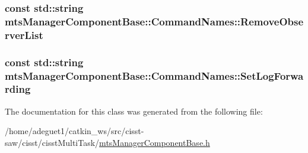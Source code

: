 \hypertarget{classmts_manager_component_base_1_1_command_names_aea2b69069bf76d20bb93e0876f9f90da}{
\subsubsection[{Remove\-Observer\-List}]{\setlength{\rightskip}{0pt plus 5cm}const std\-::string mts\-Manager\-Component\-Base\-::\-Command\-Names\-::\-Remove\-Observer\-List\hspace{0.3cm}{\ttfamily [static]}}}\label{classmts_manager_component_base_1_1_command_names_aea2b69069bf76d20bb93e0876f9f90da}
\hypertarget{classmts_manager_component_base_1_1_command_names_a494481ad11ce948eb96b3528361a9606}{
\subsubsection[{Set\-Log\-Forwarding}]{\setlength{\rightskip}{0pt plus 5cm}const std\-::string mts\-Manager\-Component\-Base\-::\-Command\-Names\-::\-Set\-Log\-Forwarding\hspace{0.3cm}{\ttfamily [static]}}}\label{classmts_manager_component_base_1_1_command_names_a494481ad11ce948eb96b3528361a9606}


The documentation for this class was generated from the following file\-:\begin{DoxyCompactItemize}
\item 
/home/adeguet1/catkin\-\_\-ws/src/cisst-\/saw/cisst/cisst\-Multi\-Task/\hyperlink{mts_manager_component_base_8h}{mts\-Manager\-Component\-Base.\-h}\end{DoxyCompactItemize}
